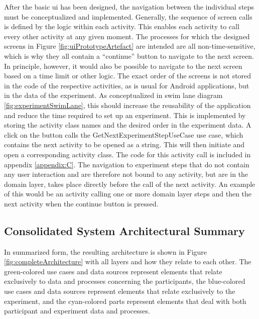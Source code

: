 After the basic \ac{ui} has been designed, the navigation between the individual steps must be conceptualized and implemented. Generally, the sequence of screen calls is defined by the logic within each activity. This enables each activity to call every other activity at any given moment. The processes for which the designed screens in Figure \ref{fig:uiPrototypeArtefact} are intended are all non-time-sensitive, which is why they all contain a \enquote{continue} button to navigate to the next screen. In principle, however, it would also be possible to navigate to the next screen based on a time limit or other logic. The exact order of the screens is not stored in the code of the respective activities, as is usual for Android applications, but in the data of the experiment. As conceptualized in swim lane diagram \ref{fig:experimentSwimLane}, this should increase the reusability of the application and reduce the time required to set up an experiment. This is implemented by storing the activity class names and the desired order in the experiment data. A click on the button calls the GetNextExperimentStepUseCase use case, which contains the next activity to be opened as a string. This will then initiate and open a corresponding activity class. The code for this activity call is included in appendix \ref{appendix:C}. The navigation to experiment steps that do not contain any user interaction and are therefore not bound to any activity, but are in the domain layer, takes place directly before the call of the next activity. An example of this would be an activity calling one or more domain layer steps and then the next activity when the continue button is pressed.

\subsection{Consolidated System Architectural Summary}\label{subsec:completeArchitecture}

In summarized form, the resulting architecture is shown in Figure \ref{fig:completeArchitecture} with all layers and how they relate to each other. The green-colored use cases and data sources represent elements that relate exclusively to data and processes concerning the participants, the blue-colored use cases and data sources represent elements that relate exclusively to the experiment, and the cyan-colored parts represent elements that deal with both participant and experiment data and processes.


